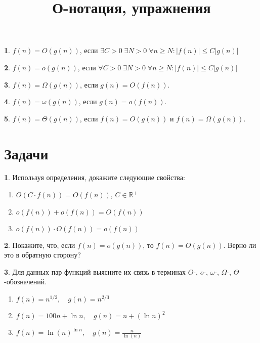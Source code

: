 \documentclass[10pt, oneside]{article}
\title{О-нотация, упражнения}
\theoremstyle{definition}
\newtheorem{problem}{}
\newtheorem{definition}{}
\begin{document}
\maketitle

\begin{definition}
$f(n) = O(g(n))$, если
$\exists C > 0 \; \exists N > 0 \; \forall n \geqslant N : |f(n)| \leqslant C |g(n)|$
\end{definition}

\begin{definition}
$f(n) = o(g(n))$, если
$\forall C > 0 \; \exists N > 0 \; \forall n \geqslant N : |f(n)| \leqslant C |g(n)|$
\end{definition}

\begin{definition}
$f(n) = \Omega(g(n))$, если $g(n) = O(f(n))$.
\end{definition}


\begin{definition}
$f(n) = \omega(g(n))$, если $g(n) = o(f(n))$.
\end{definition}

\begin{definition}
$f(n) = \Theta(g(n))$, если $f(n) = O(g(n))$ и $f(n) = \Omega(g(n))$.
\end{definition}


\section{Задачи}

\begin{problem}
Используя определения, докажите следующие свойства:
    \begin{enumerate}
        \item $O(C \cdot f(n)) = O (f(n))$, $C \in \mathbb{R}^{+}$
        \item $o(f(n)) + o(f(n)) = O(f(n))$
        \item $o(f(n)) \cdot O(f(n)) = o(f(n))$
    \end{enumerate}
\end{problem}

\begin{problem}
Покажите, что, если $f(n) = o(g(n))$, то $f(n) = O(g(n))$. Верно ли это в обратную сторону?
\end{problem}

\begin{problem}
Для данных пар функций выясните их связь в терминах
$O$-, $o$-, $\omega$-, $\Omega$-, $\Theta$-обозначений.
\begin{enumerate}
    \item $f(n) = n^{1/2}, \quad g(n) = n^{2/3}$
    \item $f(n) = 100n + \ln n, \quad g(n) = n + (\ln n)^2$
    \item $f(n) = \ln(n)^{\ln n}, \quad g(n) = \frac{n}{\ln(n)}$
\end{enumerate}
\end{problem}
\end{document}
